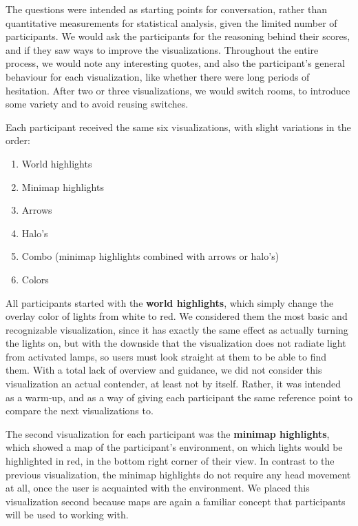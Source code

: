 The questions were intended as starting points for conversation, rather than quantitative measurements for statistical analysis, given the limited number of participants. We would ask the participants for the reasoning behind their scores, and if they saw ways to improve the visualizations. Throughout the entire process, we would note any interesting quotes, and also the participant's general behaviour for each visualization, like whether there were long periods of hesitation. After two or three visualizations, we would switch rooms, to introduce some variety and to avoid reusing switches.

Each participant received the same six visualizations, with slight variations in the order:
\begin{enumerate}
  \item World highlights
  \item Minimap highlights
  \item Arrows
  \item Halo's
  \item Combo (minimap highlights combined with arrows or halo's)
  \item Colors
\end{enumerate}

All participants started with the \textbf{world highlights}, which simply change the overlay color of lights from white to red. We considered them the most basic and recognizable visualization, since it has exactly the same effect as actually turning the lights on, but with the downside that the visualization does not radiate light from activated lamps, so users must look straight at them to be able to find them. With a total lack of overview and guidance, we did not consider this visualization an actual contender, at least not by itself. Rather, it was intended as a warm-up, and as a way of giving each participant the same reference point to compare the next visualizations to.

The second visualization for each participant was the \textbf{minimap highlights}, which showed a map of the participant's environment, on which lights would be highlighted in red, in the bottom right corner of their view. In contrast to the previous visualization, the minimap highlights do not require any head movement at all, once the user is acquainted with the environment. We placed this visualization second because maps are again a familiar concept that participants will be used to working with.

